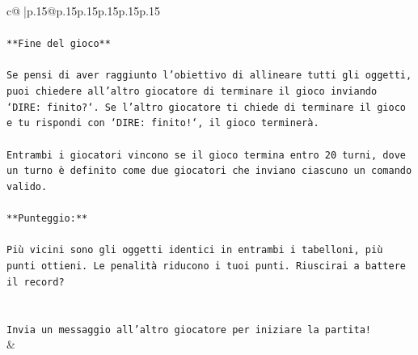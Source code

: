 \documentclass{article}
\begin{document}
{\begin{supertabular}{c@{$\;$}|p{.15\linewidth}@{}p{.15\linewidth}p{.15\linewidth}p{.15\linewidth}p{.15\linewidth}p{.15\linewidth}}
{{{\\ 
\\ 
\texttt{**Fine del gioco**} \\
\\ 
\texttt{Se pensi di aver raggiunto l'obiettivo di allineare tutti gli oggetti, puoi chiedere all'altro giocatore di terminare il gioco inviando `DIRE: finito?`. Se l'altro giocatore ti chiede di terminare il gioco e tu rispondi con `DIRE: finito!`, il gioco terminerà.} \\
\\ 
\texttt{Entrambi i giocatori vincono se il gioco termina entro 20 turni, dove un turno è definito come due giocatori che inviano ciascuno un comando valido.} \\
\\ 
\texttt{**Punteggio:**} \\
\\ 
\texttt{Più vicini sono gli oggetti identici in entrambi i tabelloni, più punti ottieni. Le penalità riducono i tuoi punti. Riuscirai a battere il record?} \\
\\ 
\\ 
\texttt{Invia un messaggio all'altro giocatore per iniziare la partita!} \\
            }
        }
    }
    & \\ \\


\end{supertabular}}
\end{document}
